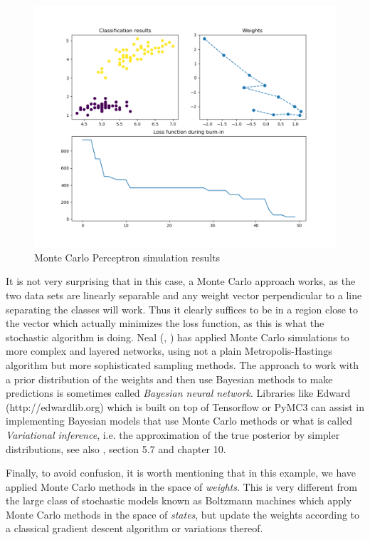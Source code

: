 \documentclass[a4paper, draft]{report}
\numberwithin{section}{chapter}
\numberwithin{equation}{chapter}
\theoremstyle{own}
\theoremstyle{remark}
\begin{document}
\begin{figure}[ht]
\centering
\includegraphics[scale=0.5]{MonteCarloPerceptron.png}
\caption{Monte Carlo Perceptron simulation results}
\label{fig:MonteCarloPerceptron}
\end{figure}

It is not very surprising that in this case, a Monte Carlo approach works, as the two data sets are linearly separable and any weight vector perpendicular to a line separating the classes will work. Thus it clearly suffices to be in a region close to the vector which actually minimizes the loss function, as this is what the stochastic algorithm is doing. Neal (\cite{Neal1993}, \cite{Neal1996}) has applied Monte Carlo simulations to more complex and layered networks, using not a plain Metropolis-Hastings algorithm but more sophisticated sampling methods. The approach to work with a prior distribution of the weights and then use Bayesian methods to make predictions is sometimes called {\em Bayesian neural network}. Libraries like Edward (http://edwardlib.org) which is built on top of Tensorflow or PyMC3 can assist in implementing Bayesian models that use Monte Carlo methods or what is called {\em Variational inference}, i.e. the approximation of the true posterior by simpler distributions, see also \cite{Bishop}, section 5.7 and chapter 10.

Finally, to avoid confusion, it is worth mentioning that in this example, we have applied Monte Carlo methods in the space of {\em weights}. This is very different from the large class of stochastic models known as Boltzmann machines which apply Monte Carlo methods in the space of {\em states}, but update the weights according to a classical gradient descent algorithm or variations thereof. 
\end{document}
